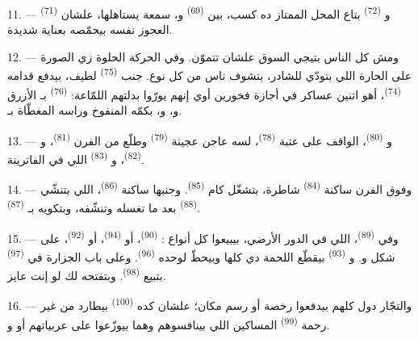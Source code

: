 11. --- و \textsuperscript{(72)} بتاع المحل الممتاز ده كسب، بين
 \textsuperscript{(69)} و، سمعة يستاهلها، علشان
 \textsuperscript{(71)} العجوز نفسه بيحمّصه بعناية شديدة.

\VUsaut{4.0mm}
\VUsaut{3.0mm}

12. --- ومش كل الناس بتيجي السوق علشان تتموّن. وفي الحركة الحلوة زي الصورة على
الحارة اللي بتودّي للشادر، بتشوف ناس من كل نوع. جنب 
\textsuperscript{(75)} لطيف، بيدفع قدامه  \textsuperscript{(74)}، أهو
اتنين عساكر في أجازة فخورين أوي إنهم يورّوا بدلتهم اللمّاعة:
 \textsuperscript{(76)} بـ الأزرق و، و، بكمّه المنفوخ وراسه المغطّاة بـ.

13. --- و \textsuperscript{(80)}، الواقف على عتبة 
\textsuperscript{(78)}، لسه عاجن عجينة  \textsuperscript{(79)} وطلّع من الفرن
 \textsuperscript{(81)}، و \textsuperscript{(82)}،
و \textsuperscript{(83)} اللي في الفاترينة.

14. --- وفوق الفرن ساكنة  \textsuperscript{(84)} شاطرة، بتشغّل كام
 \textsuperscript{(85)}. وجنبها ساكنة 
\textsuperscript{(86)}، اللي بتنشّي  \textsuperscript{(88)} بعد ما تغسله
وتنشّفه، وبتكويه بـ \textsuperscript{(87)}.

\VUsaut{4.0mm}
\VUsaut{3.0mm}

15. --- وفي  \textsuperscript{(89)}، اللي في الدور الأرضي، بيبيعوا كل
أنواع :  \textsuperscript{(90)}، أو  \textsuperscript{(94)}، أو  \textsuperscript{(92)}، على شكل
 و. و
\textsuperscript{(93)} بيقطّع اللحمة دي كلها وبيحطّ لوحده 
\textsuperscript{(96)}. وعلى باب الجزارة في 
\textsuperscript{(97)} بتبيع  \textsuperscript{(98)}. وبتفتحه لك لو
إنت عايز.

16. --- والتجّار دول كلهم بيدفعوا رخصة أو رسم مكان؛ علشان كده 
\textsuperscript{(100)} بيطارد من غير رحمة 
\textsuperscript{(99)} المساكين اللي بينافسوهم وهما بيوزّعوا على عربياتهم
 أو  و.

